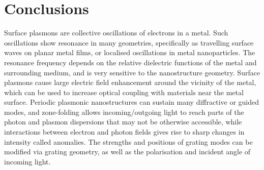 \section{Conclusions}
Surface plasmons are collective oscillations of electrons in a metal. Such oscillations show resonance in many geometries, specifically as travelling surface waves on planar metal films, or localised oscillations in metal nanoparticles. The resonance frequency depends on the relative dielectric functions of the metal and surrounding medium, and is very sensitive to the nanostructure geometry. Surface plasmons cause large electric field enhancement around the vicinity of the metal, which can be used to increase optical coupling with materials near the metal surface. Periodic plasmonic nanostructures can sustain many diffractive or guided modes, and zone-folding allows incoming/outgoing light to reach parts of the photon and plasmon dispersions that may not be otherwise accessible, while interactions between electron and photon fields gives rise to sharp changes in intensity called anomalies. The strengths and positions of grating modes can be modified via grating geometry, as well as the polarisation and incident angle of incoming light.